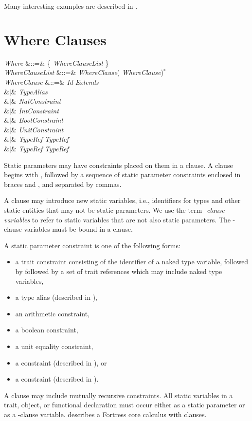 Many interesting examples are described in .



\section{Where Clauses}

\begin{Grammar}
\emph{Where} &::=&  \{ \emph{WhereClauseList} \}\\
\emph{WhereClauseList} &::=& \emph{WhereClause}(\EXP{,}
\emph{WhereClause})$^*$ \\
\emph{WhereClause} &::=& \emph{Id} \emph{Extends}\\
&$|$& \emph{TypeAlias} \\
&$|$& \emph{NatConstraint} \\
&$|$& \emph{IntConstraint} \\
&$|$& \emph{BoolConstraint} \\
&$|$& \emph{UnitConstraint} \\
&$|$& \emph{TypeRef}  \emph{TypeRef}\\
&$|$& \emph{TypeRef}  \emph{TypeRef}\\
\end{Grammar}


Static parameters may have constraints placed on them
in a  clause.
A  clause begins with
, followed by a sequence of static
parameter constraints enclosed in braces \EXP{\{} and \EXP{\}},
and separated by commas.


A  clause may introduce new static variables, i.e., identifiers
for types and other static entities that may not be static parameters.
We use the term \emph{-clause variables} to refer to
static variables that are not also static parameters.
The -clause variables must be bound in a  clause.


A static parameter constraint is one of the following forms:
\begin{itemize}
\item a trait constraint consisting of the identifier of
a naked type variable, followed by 
followed by a set of trait references which may include naked type variables,
\item a type alias (described in ),
\item an arithmetic constraint,
\item a boolean constraint,
\item a unit equality constraint,
\item a  constraint (described in
  ), or
\item a  constraint (described in
  ).
\end{itemize}
A  clause may include mutually recursive constraints.
All static variables in a trait, object, or functional declaration must
occur either as a static parameter or as a -clause variable.
 describes a Fortress core calculus with
 clauses.

